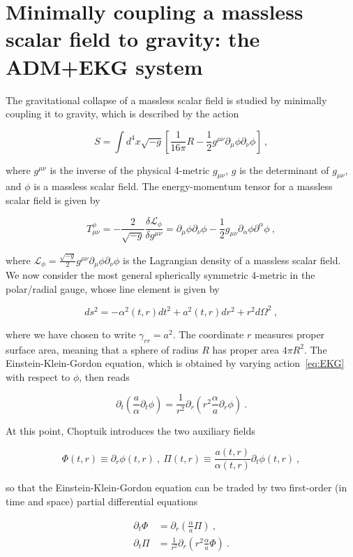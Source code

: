 \documentclass[a4paper,11pt]{article}
\renewcommand{\a}{\alpha}
\renewcommand{\d}{\delta}
\newcommand{\g}{\gamma}
\newcommand{\gDD}[2]{\g_{{#1}{#2}}}
\newcommand{\GDD}[2]{g_{{#1}{#2}}}
\newcommand{\GUU}[2]{g^{{#1}{#2}}}
\newcommand{\sqrtGdet}{\sqrt{-g}}
\newcommand{\pd}{\partial}
\renewcommand{\L}{\mathcal{L}}
\newcommand{\lrpar}[1]{\left( #1 \right)}
\newcommand{\lrsquare}[1]{\left[ #1 \right]}
\newcommand{\n}{\noindent}
\newcommand{\eq}[1]{
  \begin{equation}
    #1
  \end{equation}
}
\newcommand{\al}[1]{
  \begin{align}
    #1
  \end{align}
}
\begin{document}
\section{Minimally coupling a massless scalar field to gravity: the ADM+EKG system}

The gravitational collapse of a massless scalar field is studied by minimally coupling it to gravity, which is described by the action

\eq{S = \int d^{4}x \sqrtGdet \lrsquare{\frac{1}{16\pi}R - \frac{1}{2}\GUU{\mu}{\nu}\pd_{\mu}\phi\pd_{\nu}\phi}\ ,\label{eq:EKG}}

\n where $\GUU{\mu}{\nu}$ is the inverse of the physical 4-metric $\GDD{\mu}{\nu}$, $g$ is the determinant of $\GDD{\mu}{\nu}$, and $\phi$ is a massless scalar field. The energy-momentum tensor for a massless scalar field is given by

\eq{ T^{\phi}_{\mu\nu} = -\frac{2}{\sqrtGdet}\frac{\d\L_{\phi}}{\d\GUU{\mu}{\nu}} = \pd_{\mu}\phi\pd_{\nu}\phi - \frac{1}{2}\GDD{\mu}{\nu}\pd_{\a}\phi\pd^{\a}\phi\ , }

\n where $\L_{\phi} = \frac{\sqrtGdet}{2}\GUU{\mu}{\nu}\pd_{\mu}\phi\pd_{\nu}\phi$ is the Lagrangian density of a massless scalar field. We now consider the most general spherically symmetric 4-metric in the polar/radial gauge, whose line element is given by

\eq{ ds^{2} = -\a^{2}\lrpar{t,r}dt^{2} + a^{2}\lrpar{t,r}dr^{2} + r^{2}d\Omega^{2}\ , }

\n where we have chosen to write $\gDD{r}{r} = a^{2}$. The coordinate $r$ measures proper surface area, meaning that a sphere of radius $R$ has proper area $4\pi R^{2}$. The Einstein-Klein-Gordon equation, which is obtained by varying action~\eqref{eq:EKG} with respect to $\phi$, then reads

\eq{ \pd_{t}\lrpar{\frac{a}{\a}\pd_{t}\phi} = \frac{1}{r^{2}}\pd_{r}\lrpar{r^{2}\frac{\a}{a}\pd_{r}\phi}\ . }

\n At this point, Choptuik introduces the two auxiliary fields

\eq{ \Phi\lrpar{t,r} \equiv \pd_{r}\phi\lrpar{t,r}\ ,\ \Pi\lrpar{t,r} \equiv \frac{a\lrpar{t,r}}{\a\lrpar{t,r}}\pd_{t}\phi\lrpar{t,r}\ , }

\n so that the Einstein-Klein-Gordon equation can be traded by two first-order (in time and space) partial differential equations

\al{
  \pd_{t}\Phi &= \pd_{r}\lrpar{\frac{\a}{a}\Pi}\ , \label{eq:chop1}\\
  \pd_{t}\Pi  &= \frac{1}{r^{2}}\pd_{r}\lrpar{r^{2}\frac{\a}{a}\Phi} \label{eq:chop2}\ .
}
\end{document}
